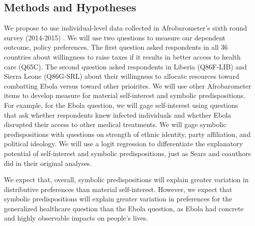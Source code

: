 \documentclass[]{article}
\begin{document}
\subsection{Methods and Hypotheses}\label{methods-and-hypotheses}

We propose to use individual-level data collected in Afrobarometer's
sixth round survey (2014-2015) . We will use two questions to measure
our dependent outcome, policy preferences. The first question asked
respondents in all 36 countries about willingness to raise taxes if it
results in better access to health care (Q65C). The second question
asked respondents in Liberia (Q86F-LIB) and Sierra Leone (Q86G-SRL)
about their willingness to allocate resources toward combatting Ebola
versus toward other prioirites. We will use other Afrobarometer items to
develop measure for material self-interest and symbolic predispositions.
For example, for the Ebola question, we will gage self-interest using
questions that ask whether respondents knew infected individuals and
whether Ebola disrupted their access to other medical treatments. We
will gage symbolic predispositions with questions on strength of ethnic
identity, party affiliation, and political ideology. We will use a logit
regression to differentiate the explanatory potential of self-interest
and symbolic predispositions, just as Sears and coauthors did in their
original analyses.

We expect that, overall, symbolic predispositions will explain greater
variation in distributive preferences than material self-interest.
However, we expect that symbolic predispositions will explain greater
variation in preferences for the generalized healthcare question than
the Ebola question, as Ebola had concrete and highly observable impacts
on people's lives.
\end{document}
